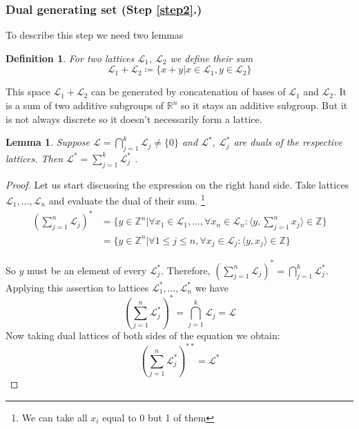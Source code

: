 \documentclass[12pt]{article}
\newcommand{\ZZ}{\mathbb{Z}}
\newcommand{\LL}{\mathcal{L}}
\newtheorem{lemma}{Lemma}
\newtheorem{definition}{Definition}
\begin{document}
\subsubsection{Dual generating set (Step \ref{step2}.)}
\label{subsubsec:dual_gen_set}
To describe this step we need two lemmas
\begin{definition}
    For two lattices $\LL_1$, $\LL_2$ we define their sum
\[
    \LL_1 + \LL_2 \coloneqq \{x + y | x \in \LL_1, y \in \LL_2\}
\]
\end{definition}
This space $\LL_{1} + \LL_{2}$ can be generated by concatenation of bases of $\LL_{1}$ and $\LL_{2}$. It is a sum of two additive subgroups of $\mathbb{R}^{n}$ so it stays an additive subgroup. But it is not always discrete so it doesn't necessarily form a lattice.

\begin{lemma}
    \label{lemma_intersection}
    Suppose $\LL = \bigcap_{j=1}^{k} \LL_{j} \neq \{0\}$ and $\LL^{*}$, $\LL_{j}^{*}$ are duals of the respective lattices. Then $\LL^{*} = \sum_{j=1}^{k} \LL_{j}^{*}$ .
\end{lemma}
\begin{proof}
    Let us start discussing the expression on the right hand side. Take lattices $\LL_{1}, \dots, \LL_{n}$ and evaluate the dual of their sum.
    \footnote{We can take all $x_{i}$ equal to 0 but 1 of them}
\[
\begin{split}
(\sum_{j=1}^{n}\LL_j)^{*} & = \{y \in \ZZ^{n} | \forall x_{1} \in \LL_1, \dots, \forall x_{n} \in \LL_n: \langle y, \sum_{j=1}^{n} x_{j} \rangle \in \ZZ \} \\
& = \{y \in \ZZ^{n} | \forall 1 \leq j \leq n, \forall x_{j} \in \LL_j: \langle y,  x_{j} \rangle \in \ZZ \}
\end{split}
\]

So $y$ must be an element of every $\LL_{j}^{*}$. Therefore, $(\sum_{j=1}^{n}\LL_j)^{*} = \bigcap_{j=1}^{k} \LL_{j}^{*}$. Applying this assertion to lattices $\LL_{1}^{*}, \dots, \LL_{n}^{*}$ we have
\[
(\sum_{j=1}^{n}\LL_j^{*})^{*} = \bigcap_{j=1}^{k} \LL_{j} = \LL
\]
Now taking dual lattices of both sides of the equation we obtain:
\[
(\sum_{j=1}^{n}\LL_j^{*})^{**} = \LL^{*}
\]

\end{proof}
\end{document}
